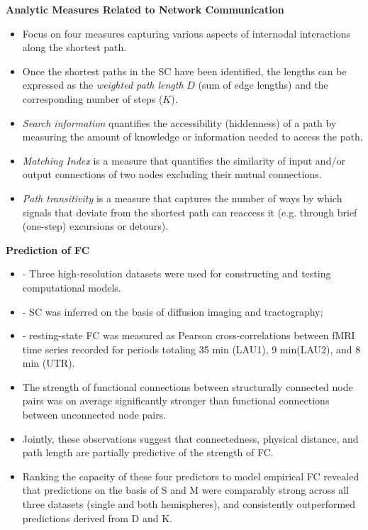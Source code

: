 \documentclass[11pt, letterpaper]{article}
\begin{document}
\noindent\textbf{Analytic Measures Related to Network Communication}
\begin{itemize}
    \setlength\itemsep{0.05em}
    
    \item Focus on four measures capturing various aspects of internodal interactions along the shortest path.
    \item Once the shortest paths in the SC have been identified, the lengths can be expressed as the \textit{weighted path length} $D$ (sum of edge lengths) and the corresponding number of steps ($K$).
    \item \textit{Search information} quantifies the accessibility (hiddenness) of a path by measuring the amount of knowledge or information needed to access the path.
    \item \textit{Matching Index} is a measure that quantifies the similarity of input and/or output connections of two nodes excluding their mutual connections.
    \item \textit{Path transitivity} is a measure that captures the number of ways by which signals that deviate from the shortest path can reaccess it (e.g. through brief (one-step) excursions or detours).
\end{itemize}


\noindent\textbf{Prediction of FC}
\begin{itemize}
    \setlength\itemsep{0.05em}
    
    \item - Three high-resolution datasets were used for constructing and testing computational models.
    \item - SC was inferred on the basis of diffusion imaging and tractography; 
    \item - resting-state FC was measured as Pearson cross-correlations between fMRI time series recorded for periods totaling 35 min (LAU1), 9 min(LAU2), and 8 min (UTR).
    \item The strength of functional connections between structurally connected node pairs was on average significantly stronger than functional connections between unconnected node pairs.
    \item Jointly, these observations suggest that connectedness, physical distance, and path length are partially predictive of the strength of FC.
    \item Ranking the capacity of these four predictors to model empirical FC revealed that predictions on the basis of S and M were comparably strong across all three datasets (single and both hemispheres), and consistently outperformed predictions derived from D and K.
\end{itemize}
\end{document}

